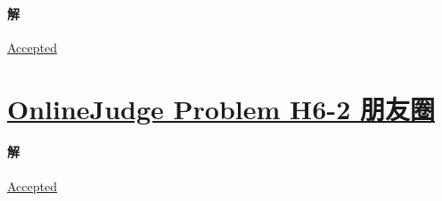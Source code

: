 \documentclass{article}
\newcommand{\SetHrefColor}[1]{
	\hypersetup{urlcolor=#1}
}
\begin{document}
\SetHrefColor{blue!30!green}

\paragraph{解}
\href{https://202.38.86.171/status/214763fc9b554bc707672516ed00b098}{\underline{Accepted}}

\SetHrefColor{black}
\section{\href{https://202.38.86.171/problem/H6-1}{OnlineJudge Problem H6-2 朋友圈}}
\SetHrefColor{blue!30!green}
\paragraph{解}
\href{https://202.38.86.171/status/cbfdfebe3bdab71e6f2d4f03a50629eb}{\underline{Accepted}}
\end{document}
